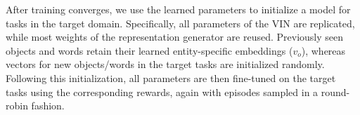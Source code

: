 After training converges, we use the learned parameters to initialize a model for tasks in the target domain. Specifically, all parameters of the VIN are replicated, while most weights of the representation generator are reused. Previously seen objects and words retain their learned entity-specific embeddings ($v_o$), whereas vectors for new objects/words in the target tasks are initialized randomly. Following this initialization, all parameters are then fine-tuned on the target tasks using the corresponding rewards, again with episodes sampled in a round-robin fashion.
 




 




